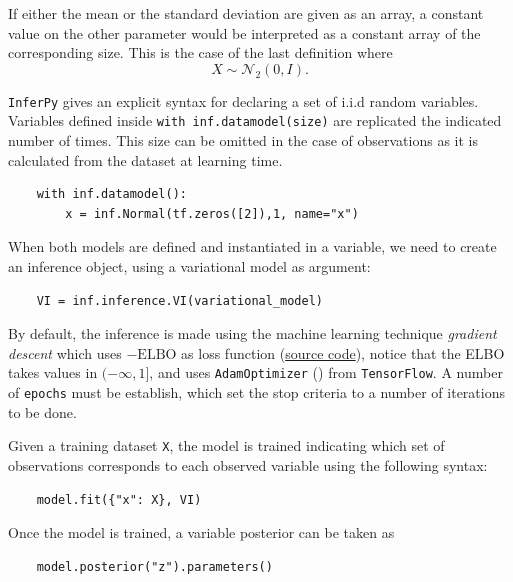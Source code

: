 If either the mean or the standard deviation are given as an array, a constant value on the other parameter would be interpreted as a constant array of the corresponding size. This is the case of the last definition where
\[
  X \sim \mathcal{N}_{2}(0,I).
\]

\texttt{InferPy} gives an explicit syntax for declaring a set of i.i.d random variables. Variables defined inside \texttt{with inf.datamodel(size)} are replicated the indicated number of times. This size can be omitted in the case of observations as it is calculated from the dataset at learning time.
\begin{verbatim}
    with inf.datamodel():
        x = inf.Normal(tf.zeros([2]),1, name="x")
\end{verbatim}

When both models are defined and instantiated in a variable, we need to create an inference object, using a variational model as argument:
\begin{verbatim}
    VI = inf.inference.VI(variational_model)
\end{verbatim}

By default, the inference is made using the machine learning technique \emph{gradient descent} which uses \(-\text{ELBO}\) as loss function (\href{https://github.com/PGM-Lab/InferPy/blob/master/inferpy/inference/variational/loss_functions/elbo.py}{source code}), notice that the ELBO takes values in \((-\infty, 1]\),  and uses \texttt{AdamOptimizer} (\cite{kingma2014adam}) from \texttt{TensorFlow}. A number of \texttt{epochs} must be establish, which set the stop criteria to a number of iterations to be done.

Given a training dataset \texttt{X}, the model is trained indicating which set of observations corresponds to each observed variable using the following syntax:
\begin{verbatim}
    model.fit({"x": X}, VI)
\end{verbatim}
Once the model is trained, a variable posterior can be taken as
\begin{verbatim}
    model.posterior("z").parameters()
\end{verbatim}
